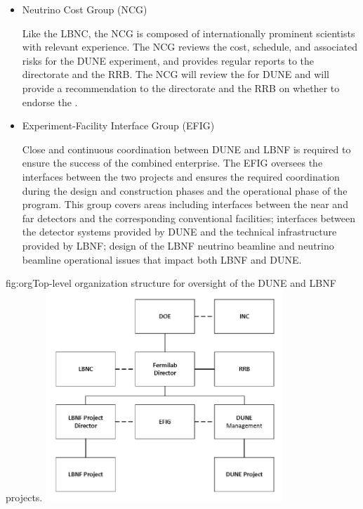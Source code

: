 \begin{itemize}

Upon request from the Fermilab director, the LBNC may employ additional DUNE and LBNF scrutiny groups for more detailed reports and evaluations. 

\item Neutrino Cost Group (NCG)

Like the LBNC, the NCG is composed of internationally prominent scientists with relevant experience.  The NCG reviews the cost, schedule, and associated risks for the DUNE experiment, and provides regular reports to the \fnal directorate and the RRB.  The NCG will review the  for DUNE and will provide a recommendation to the \fnal directorate and the RRB on whether to endorse the .


\item Experiment-Facility Interface Group (EFIG)

Close and continuous coordination between DUNE and LBNF is required to ensure the success of the combined enterprise. The EFIG  oversees the interfaces between the two projects and ensures the required coordination during the design and construction phases and the operational phase of the program. This group covers areas including interfaces between the near and far detectors and the corresponding conventional facilities; interfaces between the detector systems provided by DUNE and the technical infrastructure provided by LBNF; design of the LBNF neutrino beamline and neutrino beamline operational issues that impact both LBNF and DUNE.  

\end{itemize}

\begin{dunefigure}	
{fig:org}{Top-level organization structure for oversight of the DUNE and LBNF projects.}
\includegraphics[width=0.67\textwidth]{graphics/lbnf_dune_org.png}  %
\end{dunefigure}

